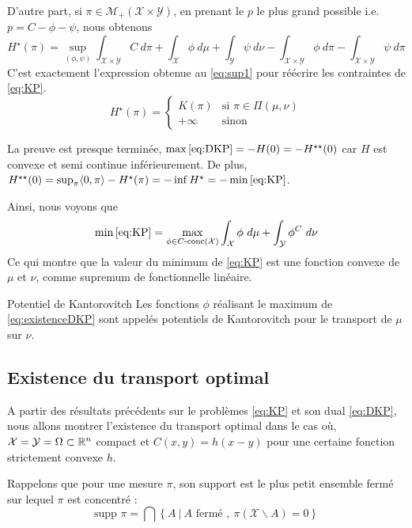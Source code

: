 \documentclass[a4paper,12pt]{article}
\newcommand{\supp}{\text{supp }}
\begin{document}
\begin{preuve}
D'autre part, si $\pi\in\mathcal{M}_+(\mathcal{X}\times\mathcal{Y})$, en prenant le $p$ le plus grand possible i.e. $p=C-\phi-\psi$, nous obtenons 
$$
H^{\star}(\pi)=  \sup_{(\phi,\psi)} \int_{\mathcal{X}\times\mathcal{Y}} C\ d\pi + \int_{\mathcal{X}}\phi\ d\mu + \int_{\mathcal{Y}}\psi\ d\nu - \int_{\mathcal{X}\times\mathcal{Y}} \phi\ d\pi -\int_{\mathcal{X}\times\mathcal{Y}} \psi\ d\pi
$$
C'est exactement l'expression obtenue au \eqref{eq:sup1} pour réécrire les contraintes de \eqref{eq:KP}. 
$$
H^{\star}(\pi)=\left\{
\begin{array}{cl}
K(\pi) & \text{si } \pi \in\Pi(\mu,\nu)\\
+\infty & \text{sinon}
\end{array}
\right.
$$

La preuve est presque terminée, $\max\eqref{eq:DKP} = -H(0) =- H^{\star\star}(0)$ car $H$ est convexe et semi continue inférieurement. De plus, $H^{\star\star}(0)=\sup_{\pi}\langle 0,\pi\rangle-H^{\star}(\pi)=-\inf H^{\star}=-\min\eqref{eq:KP}$.
\end{preuve}

Ainsi, nous voyons que 
$$
\min\eqref{eq:KP}= \max_{\phi\in C\text{-conc}(\mathcal{X})}\int_{\mathcal{X}}\phi\ d\mu +\int_{\mathcal{Y}} \phi^C\ d\nu
$$
Ce qui montre que la valeur du minimum de \eqref{eq:KP} est une fonction convexe de $\mu$ et $\nu$, comme supremum de fonctionnelle linéaire. 
\begin{definition}{Potentiel de Kantorovitch}
Les fonctions $\phi$ réalisant le maximum de \eqref{eq:existenceDKP} sont appelés potentiels de Kantorovitch pour le transport de $\mu$ sur $\nu$.
\end{definition}

\subsection{Existence du transport optimal}

A partir des résultats précédents sur le problèmes \eqref{eq:KP} et son dual \eqref{eq:DKP}, nous allons montrer l'existence du transport optimal dans le cas où, $\mathcal{X}=\mathcal{Y}=\Omega\subset\mathbb{R}^n$ compact et $C(x,y)=h(x-y)$ pour une certaine fonction strictement convexe $h$. 

Rappelons que pour une mesure $\pi$, son support est le plus petit ensemble fermé sur lequel $\pi$ est concentré : 
$$
\supp \pi = \bigcap \left\{A\ |\ A \text{ fermé },\ \pi(\mathcal{X}\backslash A) = 0 \right\}
$$
\end{document}

